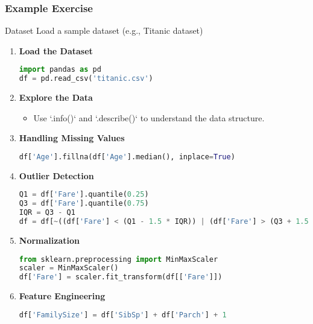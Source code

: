 \documentclass[aspectratio=169]{beamer}
\begin{document}
\begin{frame}[fragile]
    \frametitle{Example Exercise}
    \begin{block}{Dataset}
        Load a sample dataset (e.g., Titanic dataset)
    \end{block}

    \begin{enumerate}
        \item \textbf{Load the Dataset}
        \begin{lstlisting}[language=Python]
import pandas as pd
df = pd.read_csv('titanic.csv')
        \end{lstlisting}

        \item \textbf{Explore the Data}
        \begin{itemize}
            \item Use `.info()` and `.describe()` to understand the data structure.
        \end{itemize}

        \item \textbf{Handling Missing Values}
        \begin{lstlisting}[language=Python]
df['Age'].fillna(df['Age'].median(), inplace=True)
        \end{lstlisting}

        \item \textbf{Outlier Detection}
        \begin{lstlisting}[language=Python]
Q1 = df['Fare'].quantile(0.25)
Q3 = df['Fare'].quantile(0.75)
IQR = Q3 - Q1
df = df[~((df['Fare'] < (Q1 - 1.5 * IQR)) | (df['Fare'] > (Q3 + 1.5 * IQR)))]
        \end{lstlisting}

        \item \textbf{Normalization}
        \begin{lstlisting}[language=Python]
from sklearn.preprocessing import MinMaxScaler
scaler = MinMaxScaler()
df['Fare'] = scaler.fit_transform(df[['Fare']])
        \end{lstlisting}

        \item \textbf{Feature Engineering}
        \begin{lstlisting}[language=Python]
df['FamilySize'] = df['SibSp'] + df['Parch'] + 1
        \end{lstlisting}
    \end{enumerate}
\end{frame}
\end{document}
